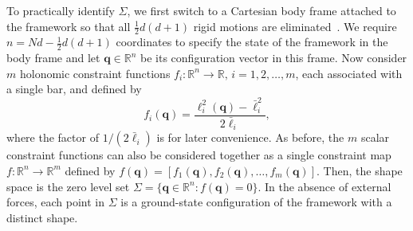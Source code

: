To practically identify $\Sigma$, we first switch to a Cartesian body frame attached to the framework so that all $\tfrac{1}{2}d(d+1)$ rigid motions are eliminated~\cite{herschbach1959,echenique2011}.
We require $n = Nd - \tfrac{1}{2}d(d+1)$ coordinates to specify the state of the framework in the body frame and let $\bm{q} \in \mathbb{R}^{n}$ be its configuration vector in this frame.
Now consider $m$ holonomic constraint functions $f_i: \mathbb{R}^{n} \to \mathbb{R},\,i=1,2,\ldots,m$, each associated with a single bar, and defined by
%
\begin{equation}
  f_i(\bm{q}) = \frac{\ell_i^2(\bm{q}) - \bar{\ell}_i^2}{2\bar{\ell}_i},
  \label{eq:consmap}
\end{equation}
%
where the factor of $1/(2\bar{\ell}_i)$ is for later convenience.
As before, the $m$ scalar constraint functions can also be considered together as a single constraint map $f: \mathbb{R}^{n} \to \mathbb{R}^m$ defined by $f(\bm{q}) = [f_1(\bm{q}), f_2(\bm{q}), \ldots, f_m(\bm{q})]$.
Then, the shape space is the zero level set $\Sigma = \{\bm{q} \in \mathbb{R}^{n}: f(\bm{q}) = 0\}$.
In the absence of external forces, each point in $\Sigma$ is a ground-state configuration of the framework with a distinct shape.

